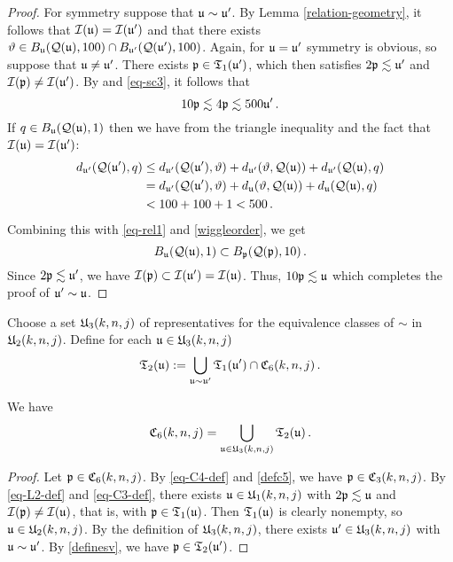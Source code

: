 \begin{proof}
    For symmetry suppose that ${\mathfrak u} \sim {\mathfrak u}'$. By Lemma \eqref{relation-geometry}, it follows that ${\mathcal{I}}({\mathfrak u}) = {\mathcal{I}}({\mathfrak u}')$ and that there exists ${\vartheta} \in B_{{\mathfrak u}}({\mathcal{Q}}({\mathfrak u}), 100) \cap B_{{\mathfrak u}'}({\mathcal{Q}}({\mathfrak u}'), 100)$. Again, for ${\mathfrak u} = {\mathfrak u}'$ symmetry is obvious, so suppose that ${\mathfrak u} \ne {\mathfrak u}'$. There exists ${\mathfrak p} \in \mathfrak{T}_1({\mathfrak u}')$, which then satisfies $2{\mathfrak p}\lesssim {\mathfrak u}'$ and ${\mathcal{I}}({\mathfrak p}) \neq {\mathcal{I}}({\mathfrak u}')$. By  and \eqref{eq-sc3}, it follows that
    \begin{equation}
        \label{eq-rel1}
        10{\mathfrak p} \lesssim 4{\mathfrak p} \lesssim 500 {\mathfrak u}'\,.
    \end{equation}
    If $q \in B_{{\mathfrak u}}({\mathcal{Q}}({\mathfrak u}),1)$ then we have from the triangle inequality and the fact that ${\mathcal{I}}({\mathfrak u}) = {\mathcal{I}}({\mathfrak u}')$:
    \begin{align*}
        d_{{\mathfrak u}'}({\mathcal{Q}}({\mathfrak u}'), q) &\le d_{{\mathfrak u}'}({\mathcal{Q}}({\mathfrak u}'), {\vartheta}) + d_{{\mathfrak u}'}({\vartheta}, {\mathcal{Q}}({\mathfrak u})) + d_{{\mathfrak u}'}({\mathcal{Q}}({\mathfrak u}), q)\\
        &= d_{{\mathfrak u}'}({\mathcal{Q}}({\mathfrak u}'), {\vartheta}) + d_{{\mathfrak u}}({\vartheta}, {\mathcal{Q}}({\mathfrak u})) + d_{{\mathfrak u}}({\mathcal{Q}}({\mathfrak u}), q)\\
        &< 100 + 100 + 1 < 500\,.
    \end{align*}
    Combining this with \eqref{eq-rel1} and \eqref{wiggleorder}, we get
    \begin{equation*}
     B_{{\mathfrak u}}({\mathcal{Q}}({\mathfrak u}), 1) \subset B_{{\mathfrak p}}({\mathcal{Q}}({\mathfrak p}), 10)\, .
    \end{equation*}
    Since $2{\mathfrak p} \lesssim {\mathfrak u}'$, we have ${\mathcal{I}}({\mathfrak p}) \subset {\mathcal{I}}({\mathfrak u}') = {\mathcal{I}}({\mathfrak u})$. Thus, $10{\mathfrak p} \lesssim {\mathfrak u}$ which completes the proof of ${\mathfrak u}' \sim {\mathfrak u}$.
\end{proof}

Choose a set ${\mathfrak U}_3(k,n,j)$ of representatives for the equivalence
classes of $\sim$ in ${\mathfrak U}_2(k,n,j)$.
Define for each ${\mathfrak u}\in {\mathfrak U}_3(k,n,j)$
\begin{equation}\label{definesv}
{\mathfrak T}_2({\mathfrak u}):=
   \bigcup_{{\mathfrak u}\sim {\mathfrak u}'}\mathfrak{T}_1({\mathfrak u}')\cap {\mathfrak C}_6(k,n,j)\, .
\end{equation}

\begin{lemma}[C6 forest]
\label{C6-forest}
\leanok
{}
We have
\begin{equation}
    {\mathfrak C}_6(k,n,j)=\bigcup_{{\mathfrak u}\in {\mathfrak U}_3(k,n,j)}\mathfrak{T}_2({\mathfrak u})\, .
\end{equation}
\end{lemma}
\begin{proof}
    \leanok
    Let ${\mathfrak p} \in {\mathfrak C}_6(k,n,j)$.
    By \eqref{eq-C4-def} and \eqref{defc5}, we have ${\mathfrak p} \in {\mathfrak C}_3(k,n,j)$. By \eqref{eq-L2-def} and \eqref{eq-C3-def}, there exists ${\mathfrak u} \in {\mathfrak U}_1(k,n,j)$ with $2{\mathfrak p} \lesssim {\mathfrak u}$ and ${\mathcal{I}}({\mathfrak p}) \ne {\mathcal{I}}({\mathfrak u})$, that is, with ${\mathfrak p} \in \mathfrak{T}_1({\mathfrak u})$. Then $\mathfrak{T}_1({\mathfrak u})$ is clearly nonempty, so ${\mathfrak u} \in {\mathfrak U}_2(k,n,j)$. By the definition of ${\mathfrak U}_3(k,n,j)$, there exists ${\mathfrak u}' \in {\mathfrak U}_3(k,n,j)$ with ${\mathfrak u} \sim {\mathfrak u}'$. By \eqref{definesv}, we have ${\mathfrak p} \in \mathfrak{T}_2({\mathfrak u}')$.
\end{proof}


